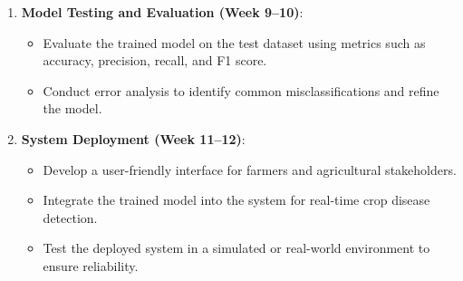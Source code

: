 \begin{enumerate}
    \item \textbf{Model Testing and Evaluation (Week 9–10)}:
    \begin{itemize}
        \item Evaluate the trained model on the test dataset using metrics such as accuracy, precision, recall, and F1 score.
        \item Conduct error analysis to identify common misclassifications and refine the model.
    \end{itemize}

    \item \textbf{System Deployment (Week 11–12)}:
    \begin{itemize}
        \item Develop a user-friendly interface for farmers and agricultural stakeholders.
        \item Integrate the trained model into the system for real-time crop disease detection.
        \item Test the deployed system in a simulated or real-world environment to ensure reliability.
    \end{itemize}
\end{enumerate}

